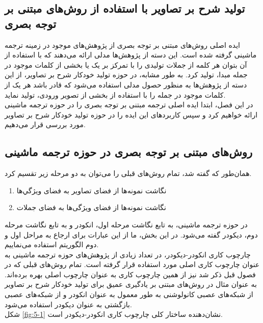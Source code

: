 \subsection{تولید شرح بر تصاویر با استفاده از روش‌های مبتنی بر توجه بصری}
ایده‌ اصلی روش‌های مبتنی بر توجه بصری از پژوهش‌های موجود در زمینه ترجمه ماشینی گرفته شده است. این دسته از پژوهش‌ها مدلی ارائه می‌دهند که با استفاده از آن بتوان هر کلمه از جملات تولیدی را با تمرکز بر یک یا بخشی از کلمات موجود در جمله مبدا‌، تولید کرد. به طور مشابه، در حوزه تولید خودکار شرح بر تصاویر، از این دسته از پژوهش‌ها به منظور حصول مدلی استفاده می‌شود که قادر باشد هر یک از کلمات موجود در جمله را با استفاده از بخشی از تصویر ورودی، تولید نماید.
\\
در این فصل، ابتدا ایده اصلی ترجمه مبتنی بر توجه بصری را در حوزه ترجمه ماشینی ارائه خواهیم کرد و سپس کاربردهای این ایده را در حوزه تولید خودکار شرح بر تصاویر مورد بررسی قرار می‌دهیم. 

\subsection{روش‌های مبتنی بر توجه بصری در حوزه ترجمه ماشینی}

همان‌طور که گفته شد، تمام روش‌های قبلی را می‌توان به دو مرحله زیر تقسیم کرد.
\begin{enumerate}
\item نگاشت نمونه‌ها از فضای تصاویر به فضای ویژگي‌ها
\item نگاشت نمونه‌ها از فضای ویژگی‌ها به فضای جملات
\end{enumerate}

در حوزه ترجمه ماشینی، به تابع نگاشت مرحله اول، انکودر و به تابع نگاشت مرحله دوم، دیکودر گفته می‌شود. در این بخش، ما از این عبارات برای ارجاع به مراحل اول و دوم الگوریتم استفاده می‌نماییم.
\\
چارچوب کاری انکودر-دیکودر، در تعداد زیادی از پژوهش‌های حوزه ترجمه ماشینی به عنوان چارچوب کاری اصلی مورد استفاده قرار گرفته است. تمام روش‌های قبلی که در فصول قبل ذکر شد نیز از همین چارچوب کاری به عنوان چارچوب اصلی بهره برده‌اند. به عنوان مثال در روش‌های مبتنی بر یادگیری عمیق برای تولید خودکار شرح بر تصاویر از شبکه‌های عصبی کانولوشنی به طور معمول به عنوان انکودر و از شبکه‌های عصبی بازگشتی به عنوان دیکودر استفاده می‌شود.
\\
شکل \ref{fig:5-1} نشان‌دهنده ساختار کلی چارچوب کاری انکودر-دیکودر است.

